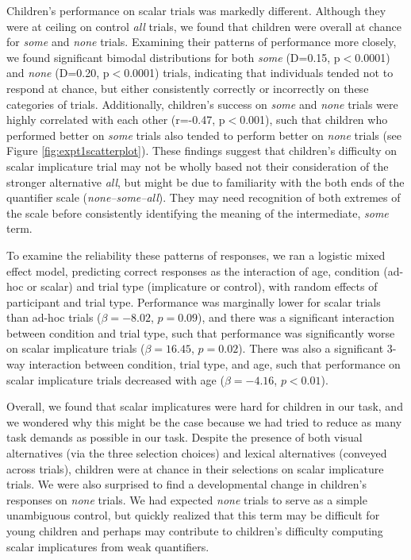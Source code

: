 \documentclass[10pt,letterpaper]{article}
\begin{document}
Children's performance on scalar trials was markedly different. Although they were at ceiling on control \emph{all} trials, we found that children were overall at chance for \emph{some} and \emph{none} trials.  Examining their patterns of performance more closely, we found significant bimodal distributions for both \emph{some} (D=0.15, p$<$0.0001) and \emph{none} (D=0.20, p$<$0.0001) trials, indicating that individuals tended not to respond at chance, but either consistently correctly or incorrectly on these categories of trials. Additionally, children's success on \emph{some} and \emph{none} trials were highly correlated with each other (r=-0.47, p$<$0.001), such that children who performed better on \emph{some} trials also tended to perform better on \emph{none} trials (see Figure \ref{fig:expt1scatterplot}).  These findings suggest that children's difficulty on scalar implicature trial may not be wholly based not their consideration of the stronger alternative \emph{all}, but might be due to familiarity with the both ends of the quantifier scale (\emph{none--some--all}). They may need recognition of both extremes of the scale before consistently identifying the meaning of the intermediate, \emph{some} term. 

To examine the reliability these patterns of responses, we ran a logistic mixed effect model, predicting correct responses as the interaction of age, condition (ad-hoc or scalar) and trial type (implicature or control), with random effects of participant and trial type. Performance was marginally lower for scalar trials than ad-hoc trials ($\beta = -8.02$, $p =0.09$), and there was a significant interaction between condition and trial type, such that performance was significantly worse on scalar implicature trials ($\beta = 16.45$, $p = 0.02$).  There was also a significant 3-way interaction between condition, trial type, and age, such that performance on scalar implicature trials decreased with age ($\beta = -4.16$, $p < 0.01$). 

Overall, we found that scalar implicatures were hard for children in our task, and we wondered why this might be the case because we had tried to reduce as many task demands as possible in our task. Despite the presence of both visual alternatives (via the three selection choices) and lexical alternatives (conveyed across trials), children were at chance in their selections on scalar implicature trials. We were also surprised to find a developmental change in children's responses on \emph{none} trials. 
We had expected \emph{none} trials to serve as a simple unambiguous control, but quickly realized that this term may be difficult for young children and perhaps may contribute to children's difficulty computing scalar implicatures from weak quantifiers. 
\end{document}
